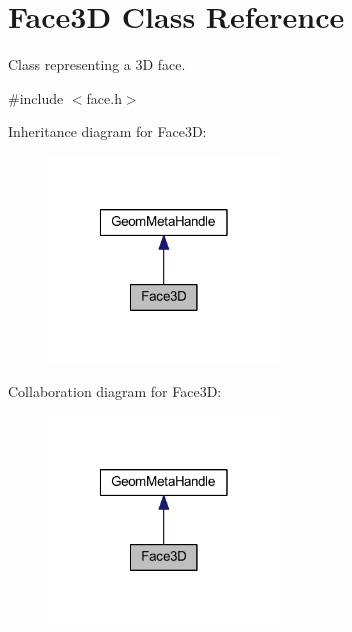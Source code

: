 \hypertarget{class_face3_d}{\section{Face3\-D Class Reference}
\label{class_face3_d}
}


Class representing a 3\-D face.  




{\ttfamily \#include $<$face.\-h$>$}



Inheritance diagram for Face3\-D\-:\nopagebreak
\begin{figure}[H]
\begin{center}
\leavevmode
\includegraphics[width=174pt]{class_face3_d__inherit__graph}
\end{center}
\end{figure}


Collaboration diagram for Face3\-D\-:\nopagebreak
\begin{figure}[H]
\begin{center}
\leavevmode
\includegraphics[width=174pt]{class_face3_d__coll__graph}
\end{center}
\end{figure}

